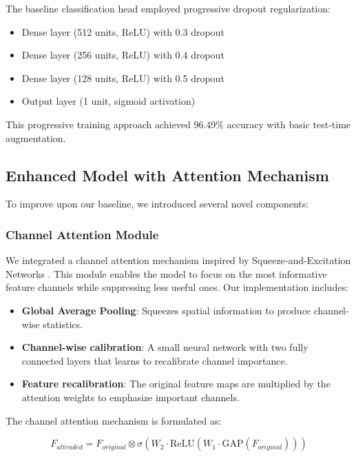 \documentclass{article}
\begin{document}
The baseline classification head employed progressive dropout regularization:
\begin{itemize}
    \item Dense layer (512 units, ReLU) with 0.3 dropout
    \item Dense layer (256 units, ReLU) with 0.4 dropout  
    \item Dense layer (128 units, ReLU) with 0.5 dropout
    \item Output layer (1 unit, sigmoid activation)
\end{itemize}

This progressive training approach achieved 96.49\% accuracy with basic test-time augmentation.

\subsection{Enhanced Model with Attention Mechanism}

To improve upon our baseline, we introduced several novel components:

\subsubsection{Channel Attention Module}

We integrated a channel attention mechanism inspired by Squeeze-and-Excitation Networks \cite{hu2018squeeze}. This module enables the model to focus on the most informative feature channels while suppressing less useful ones. Our implementation includes:

\begin{itemize}
    \item \textbf{Global Average Pooling}: Squeezes spatial information to produce channel-wise statistics.
    
    \item \textbf{Channel-wise calibration}: A small neural network with two fully connected layers that learns to recalibrate channel importance.
    
    \item \textbf{Feature recalibration}: The original feature maps are multiplied by the attention weights to emphasize important channels.
\end{itemize}

The channel attention mechanism is formulated as:

\begin{equation}
    F_{attended} = F_{original} \otimes \sigma(W_2 \cdot \text{ReLU}(W_1 \cdot \text{GAP}(F_{original})))
\end{equation}
\end{document}
